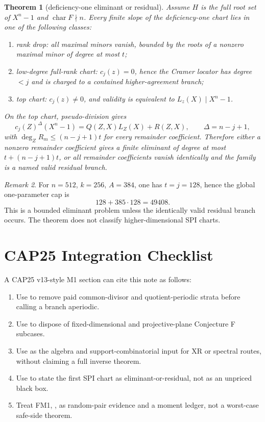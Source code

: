 \documentclass[11pt]{article}
\newtheorem{theorem}{Theorem}[section]
\theoremstyle{definition}
\theoremstyle{remark}
\newtheorem{remark}[theorem]{Remark}
\begin{document}
\begin{theorem}[deficiency-one eliminant or residual]\label{thm:spi}
Assume $H$ is the full root set of $X^n-1$ and $\operatorname{char}F\nmid n$.
Every finite slope of the deficiency-one chart lies in one of the following
classes:
\begin{enumerate}[label=(\roman*)]
        \item rank drop: all maximal minors vanish, bounded by the roots of a
        nonzero maximal minor of degree at most $t$;
        \item low-degree full-rank chart: $c_j(z)=0$, hence the Cramer locator
        has degree $<j$ and is charged to a contained higher-agreement branch;
        \item top chart: $c_j(z)\ne0$, and validity is equivalent to
        $L_z(X)\mid X^n-1$.
\end{enumerate}
On the top chart, pseudo-division gives
\[
        c_j(Z)^\Delta(X^n-1)=Q(Z,X)L_Z(X)+R(Z,X),
        \qquad \Delta=n-j+1,
\]
with $\deg_Z R_m\le (n-j+1)t$ for every remainder coefficient.  Therefore
either a nonzero remainder coefficient gives a finite eliminant of degree at
most $t+(n-j+1)t$, or all remainder coefficients vanish identically and the
family is a named valid residual branch.
\end{theorem}

\begin{remark}
For $n=512$, $k=256$, $A=384$, one has $t=j=128$, hence the global
one-parameter cap is
\[
        128+385\cdot128=49408.
\]
This is a bounded eliminant problem unless the identically valid residual
branch occurs.  The theorem does not classify higher-dimensional SPI charts.
\end{remark}

\section{CAP25 Integration Checklist}

A CAP25 v13-style M1 section can cite this note as follows:
\begin{enumerate}[label=(\arabic*)]
        \item Use  to remove paid
        common-divisor and quotient-periodic strata before calling a branch
        aperiodic.
        \item Use  to dispose of fixed-dimensional
        and projective-plane Conjecture F subcases.
        \item Use  as the algebra
        and support-combinatorial input for XR or spectral routes, without
        claiming a full inverse theorem.
        \item Use  to state the first SPI chart as
        eliminant-or-residual, not as an unpriced black box.
        \item Treat FM1, , as
        random-pair evidence and a moment ledger, not a worst-case safe-side
        theorem.
\end{enumerate}
\end{document}
